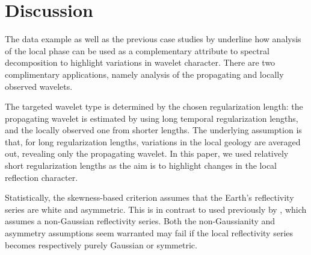 



\section{Discussion}

The data example as well as the previous case studies by \cite{mirko3}
underline how analysis of the local phase can be used as a
complementary attribute to spectral decomposition to highlight
variations in wavelet character. There are two complimentary
applications, namely analysis of the propagating and locally observed
wavelets. 
\begin{comment}
The propagating wavelet is the physical wavelet traversing
the Earth, which is affected by attenuation and dispersion; the
locally observed one is generated by interference between neighboring
reflections and thus most affected by local reflector
character \cite[]{mirko3}. 
\end{comment}
The targeted wavelet type is determined by the chosen regularization
length: the propagating wavelet is estimated by using long temporal
regularization lengths, and the locally observed one from shorter
lengths. The underlying assumption is that, for long regularization
lengths, variations in the local geology are averaged out, revealing
only the propagating wavelet. In this paper, we used relatively short
regularization lengths as the aim is to highlight changes in the local
reflection character.

Statistically, the skewness-based criterion assumes that the Earth's
reflectivity series are white and asymmetric. This is in contrast to
  used previously
by \cite{mirko2}, which assumes a non-Gaussian reflectivity
series. Both the non-Gaussianity and asymmetry assumptions seem
 warranted   may 
fail if the local reflectivity
series becomes respectively purely Gaussian or symmetric.
\begin{comment}
This may also explain why both methods do not always agree
(Figures~\ref{fig:ricker-all,ricker-sq-corr,ricker-sq-corr-inv}
and~\ref{fig:ricker2-all,ricker2-sq-corr,ricker2-sq-corr-inv}).
\end{comment}

